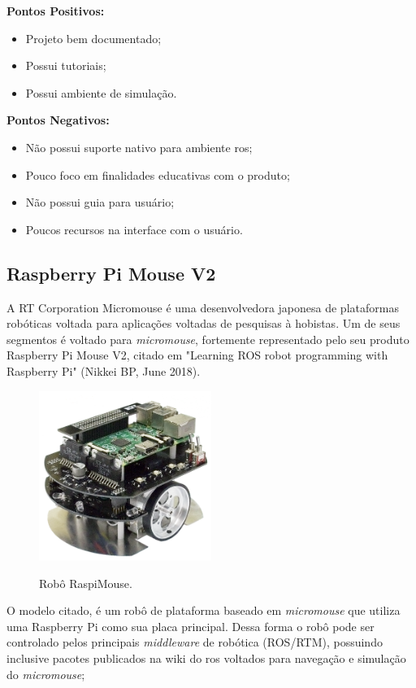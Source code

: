 \textbf{Pontos Positivos:}
\begin{itemize}
	\item Projeto bem documentado;
	\item Possui tutoriais;
	\item Possui ambiente de simulação.
\end{itemize}

\textbf{Pontos Negativos:}
\begin{itemize}
	\item Não possui suporte nativo para ambiente \gls*{ros};
	\item Pouco foco em finalidades educativas com o produto;
	\item Não possui guia para usuário;
	\item Poucos recursos na interface com o usuário.
\end{itemize}

\subsection{Raspberry Pi Mouse V2}
A RT Corporation Micromouse é uma desenvolvedora japonesa de plataformas robóticas voltada para aplicações  voltadas de pesquisas à hobistas. Um de seus segmentos é voltado para \textit{micromouse}, fortemente representado pelo seu produto Raspberry Pi Mouse V2, citado em "Learning ROS robot programming with Raspberry Pi" (Nikkei BP, June 2018).

\begin{figure}[H]
	\centering
	\caption{Robô RaspiMouse.}
	\includegraphics[width=0.5\textwidth]
	{Figures/RaspiMouse_model.png}
	\label{fig:RaspiMouse_model}
\end{figure}

O modelo citado, é um robô de plataforma baseado em \textit{micromouse} que utiliza uma Raspberry Pi como sua placa principal. Dessa forma o robô pode ser controlado pelos principais \textit{middleware} de robótica (ROS/RTM), possuindo inclusive pacotes publicados na wiki do \gls*{ros} voltados para navegação e simulação do \textit{micromouse};

